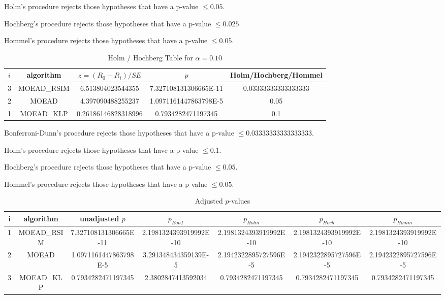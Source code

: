 \documentclass[a4paper,10pt]{article}
\begin{document}
\begin{landscape}
Holm's procedure rejects those hypotheses that have a p-value $\le0.05$.


Hochberg's procedure rejects those hypotheses that have a p-value $\le0.025$.


Hommel's procedure rejects those hypotheses that have a p-value $\le0.05$.


\begin{table}[!htp]
\centering\tiny
\caption{Holm / Hochberg Table for $\alpha=0.10$}
\begin{tabular}{ccccc}
$i$&algorithm&$z=(R_0 - R_i)/SE$&$p$&Holm/Hochberg/Hommel\\
\hline
3&MOEAD_RSIM&6.513804023544355&7.327108131306665E-11&0.03333333333333333\\
2&MOEAD&4.397090488255237&1.0971161447863798E-5&0.05\\
1&MOEAD_KLP&0.26186146828318996&0.7934282471197345&0.1\\
\hline
\end{tabular}
\end{table}
Bonferroni-Dunn's procedure rejects those hypotheses that have a p-value $\le0.03333333333333333$.


Holm's procedure rejects those hypotheses that have a p-value $\le0.1$.


Hochberg's procedure rejects those hypotheses that have a p-value $\le0.05$.


Hommel's procedure rejects those hypotheses that have a p-value $\le0.05$.


\begin{table}[!htp]
\centering\tiny
\caption{Adjusted $p$-values}
\begin{tabular}{ccccccc}
i&algorithm&unadjusted $p$&$p_{Bonf}$&$p_{Holm}$&$p_{Hoch}$&$p_{Homm}$\\
\hline
1&MOEAD_RSIM&7.327108131306665E-11&2.1981324393919992E-10&2.1981324393919992E-10&2.1981324393919992E-10&2.1981324393919992E-10\\
2&MOEAD&1.0971161447863798E-5&3.291348434359139E-5&2.1942322895727596E-5&2.1942322895727596E-5&2.1942322895727596E-5\\
3&MOEAD_KLP&0.7934282471197345&2.3802847413592034&0.7934282471197345&0.7934282471197345&0.7934282471197345\\
\hline
\end{tabular}
\end{table}


\end{landscape}
\end{document}
